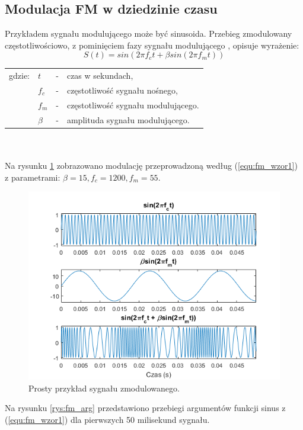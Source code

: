 \subsection{Modulacja FM w dziedzinie czasu}
Przykładem sygnału modulującego może być sinusoida. Przebieg zmodulowany częstotliwościowo, z pominięciem fazy sygnału modulującego \cite{oland}, opisuje wyrażenie:
\begin{equation} \label{equ:fm_wzor1}
S(t)= sin(2 \pi f_c t + \beta sin(2 \pi f_m t))
\end{equation}
\begin{tabular}{ l l l l}
	gdzie: & $t$ &  - & czas w sekundach, \\
	&	$f_c$ & - &  częstotliwość sygnału nośnego,\\
	&	$f_m$ & - &  częstotliwość sygnału modulującego.\\
	&	$\beta$ & - & amplituda sygnału modulującego.\\
\end{tabular} \\ \\
Na rysunku \ref{rys:fm_wykres1} zobrazowano modulację przeprowadzoną według (\ref{equ:fm_wzor1}) z parametrami: $\beta = 15, f_c = 1200, f_m = 55$.
\begin{figure}[H]
	\centering
	\includegraphics[width=12cm]{grafiki/fm_wykres1}
	\captionsetup{justification=centering}
	\caption{Prosty przykład sygnału zmodulowanego.}
	\label{rys:fm_wykres1}
\end{figure}
Na rysunku \ref{rys:fm_arg} przedstawiono przebiegi argumentów funkcji sinus z (\ref{equ:fm_wzor1}) dla pierwszych 50 milisekund sygnału.
